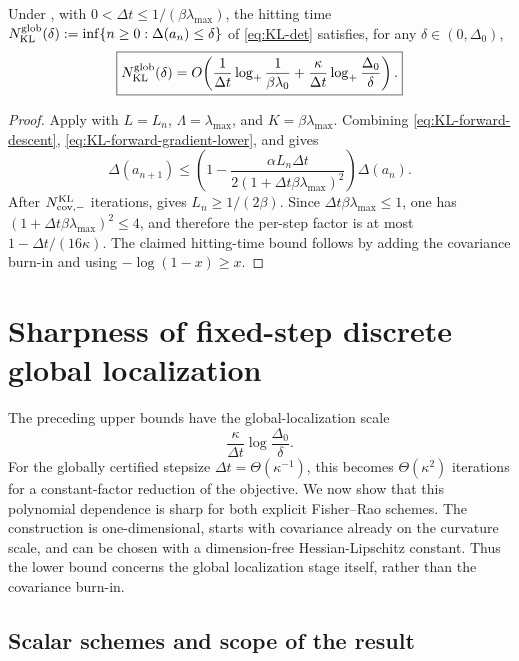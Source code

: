 \begin{theorem}
\label{thm:KL-global}
Under , with
$0<\Delta t\leq1/(\beta\lambda_{\max})$, the hitting time
$N_{\mathrm{KL}}^{\mathrm{glob}}(\delta):=\inf\{n\geq0:\Delta(a_n)\leq\delta\}$ of \eqref{eq:KL-det}
satisfies, for any $\delta\in(0,\Delta_0)$,
\[
    \boxed{
    N_{\mathrm{KL}}^{\mathrm{glob}}(\delta)
    =
    O\!\left(
        \frac1{\Delta t}\log_+\frac1{\beta\lambda_0}
        +
        \frac\kappa{\Delta t}\log_+\frac{\Delta_0}{\delta}
    \right).
    }
\]
\end{theorem}

\begin{proof}
Apply  with $L=L_n$, $\Lambda=\lambda_{\max}$, and
$K=\beta\lambda_{\max}$.  Combining
\eqref{eq:KL-forward-descent}, \eqref{eq:KL-forward-gradient-lower}, and
 gives
\[
    \Delta(a_{n+1})
    \leq
    \left(
        1-
        \frac{\alpha L_n\Delta t}{2(1+\Delta t\beta\lambda_{\max})^2}
    \right)\Delta(a_n).
\]
After $N_{\mathrm{cov},-}^{\mathrm{KL}}$ iterations,  gives
$L_n\geq1/(2\beta)$.  Since
$\Delta t\beta\lambda_{\max}\leq1$, one has
$(1+\Delta t\beta\lambda_{\max})^2\leq4$, and therefore the per-step factor is at most
$1-\Delta t/(16\kappa)$.  The claimed hitting-time bound follows by adding the covariance
burn-in and using $-\log(1-x)\geq x$.
\end{proof}

\section{Sharpness of fixed-step discrete global localization}
\label{sec:disc-sharp}

The preceding upper bounds have the global-localization scale
\[
    \frac{\kappa}{\Delta t}
    \log\frac{\Delta_0}{\delta}.
\]
For the globally certified stepsize $\Delta t=\Theta(\kappa^{-1})$, this becomes
$\Theta(\kappa^2)$ iterations for a constant-factor reduction of the objective.
We now show that this polynomial dependence is sharp for both explicit Fisher--Rao
schemes.  The construction is one-dimensional, starts with covariance already on the
curvature scale, and can be chosen with a dimension-free Hessian-Lipschitz constant.
Thus the lower bound concerns the global localization stage itself, rather than the
covariance burn-in.

\subsection{Scalar schemes and scope of the result}


